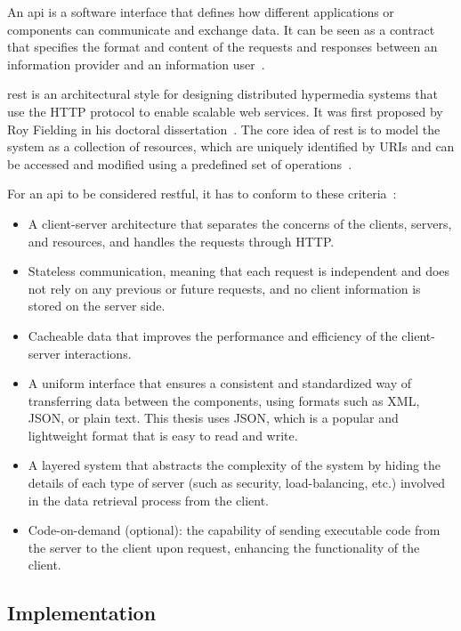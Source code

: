 An \acrfull{api} is a software interface that defines how different applications or components can communicate and exchange data. It can be seen as a contract that specifies the format and content of the requests and responses between an information provider and an information user~\parencite{redhatinc.WhatRESTAPI2020}.

\acrfull{rest} is an architectural style for designing distributed hypermedia systems that use the HTTP protocol to enable scalable web services. It was first proposed by Roy Fielding in his doctoral dissertation~\parencite{fieldingArchitecturalStylesDesign2000}. The core idea of \acrshort{rest} is to model the system as a collection of resources, which are uniquely identified by URIs and can be accessed and modified using a predefined set of operations~\parencite{framlingProductAgentsHandling2003}.

For an \acrshort{api} to be considered \acrshort{rest}ful, it has to conform to these criteria~\parencite{redhatinc.WhatRESTAPI2020,fieldingArchitecturalStylesDesign2000}:
\begin{itemize}
    \item A client-server architecture that separates the concerns of the clients, servers, and resources, and handles the requests through HTTP.
    \item Stateless communication, meaning that each request is independent and does not rely on any previous or future requests, and no client information is stored on the server side.
    \item Cacheable data that improves the performance and efficiency of the client-server interactions.
    \item A uniform interface that ensures a consistent and standardized way of transferring data between the components, using formats such as XML, JSON, or plain text. This thesis uses JSON, which is a popular and lightweight format that is easy to read and write.
    \item A layered system that abstracts the complexity of the system by hiding the details of each type of server (such as security, load-balancing, etc.) involved in the data retrieval process from the client.
    \item Code-on-demand (optional): the capability of sending executable code from the server to the client upon request, enhancing the functionality of the client.
\end{itemize}

\subsection{Implementation}

